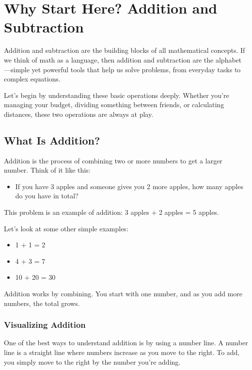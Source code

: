 \chapter{Why Start Here? Addition and Subtraction}

Addition and subtraction are the building blocks of all mathematical concepts. If we think of math as a language, then addition and subtraction are the alphabet—simple yet powerful tools that help us solve problems, from everyday tasks to complex equations.

Let’s begin by understanding these basic operations deeply. Whether you’re managing your budget, dividing something between friends, or calculating distances, these two operations are always at play.
\begin{center}
\end{center}

\section{What Is Addition?}
Addition is the process of combining two or more numbers to get a larger number. Think of it like this:
\begin{itemize}
    \item If you have 3 apples and someone gives you 2 more apples, how many apples do you have in total?
\end{itemize}
This problem is an example of addition: 3 apples + 2 apples = 5 apples.

Let’s look at some other simple examples:
\begin{itemize}
    \item 1 + 1 = 2
    \item 4 + 3 = 7
    \item 10 + 20 = 30
\end{itemize}

Addition works by combining. You start with one number, and as you add more numbers, the total grows.

\subsection{Visualizing Addition}
One of the best ways to understand addition is by using a number line. A number line is a straight line where numbers increase as you move to the right. To add, you simply move to the right by the number you're adding.


